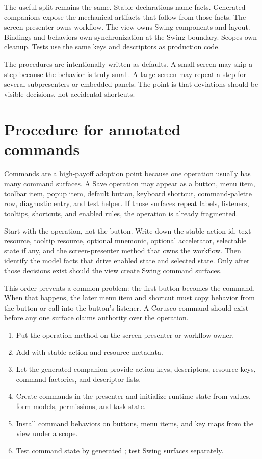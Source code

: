 The useful split remains the same. Stable declarations name facts. Generated companions expose the mechanical artifacts that follow from those facts. The screen presenter owns workflow. The view owns Swing components and layout. Bindings and behaviors own synchronization at the Swing boundary. Scopes own cleanup. Tests use the same keys and descriptors as production code.

The procedures are intentionally written as defaults. A small screen may skip a step because the behavior is truly small. A large screen may repeat a step for several subpresenters or embedded panels. The point is that deviations should be visible decisions, not accidental shortcuts.

\section{Procedure for annotated commands}

Commands are a high-payoff adoption point because one operation usually has many command surfaces. A Save operation may appear as a button, menu item, toolbar item, popup item, default button, keyboard shortcut, command-palette row, diagnostic entry, and test helper. If those surfaces repeat labels, listeners, tooltips, shortcuts, and enabled rules, the operation is already fragmented.

Start with the operation, not the button. Write down the stable action id, text resource, tooltip resource, optional mnemonic, optional accelerator, selectable state if any, and the screen-presenter method that owns the workflow. Then identify the model facts that drive enabled state and selected state. Only after those decisions exist should the view create Swing command surfaces.

This order prevents a common problem: the first button becomes the command. When that happens, the later menu item and shortcut must copy behavior from the button or call into the button's listener. A Corusco command should exist before any one surface claims authority over the operation.

\begin{enumerate}
\item Put the operation method on the screen presenter or workflow owner.
\item Add  with stable action and resource metadata.
\item Let the generated companion provide action keys, descriptors, resource keys, command factories, and descriptor lists.
\item Create commands in the presenter and initialize runtime state from values, form models, permissions, and task state.
\item Install command behaviors on buttons, menu items, and key maps from the view under a scope.
\item Test command state by generated ; test Swing surfaces separately.
\end{enumerate}

